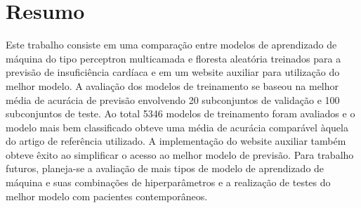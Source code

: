 \chapter*{Resumo}

Este trabalho consiste em uma comparação entre modelos de aprendizado de máquina do tipo perceptron multicamada e floresta aleatória treinados para a previsão de insuficiência cardíaca e em um website auxiliar para utilização do melhor modelo. A avaliação dos modelos de treinamento se baseou na melhor média de acurácia de previsão envolvendo 20 subconjuntos de validação e 100 subconjuntos de teste. Ao total 5346 modelos de treinamento foram avaliados e o modelo mais bem classificado obteve uma média de acurácia comparável àquela do artigo de referência utilizado. A implementação do website auxiliar também obteve êxito ao simplificar o acesso ao melhor modelo de previsão. Para trabalho futuros, planeja-se a avaliação de mais tipos de modelo de aprendizado de máquina e suas combinações de hiperparâmetros e a realização de testes do melhor modelo com pacientes contemporâneos.
